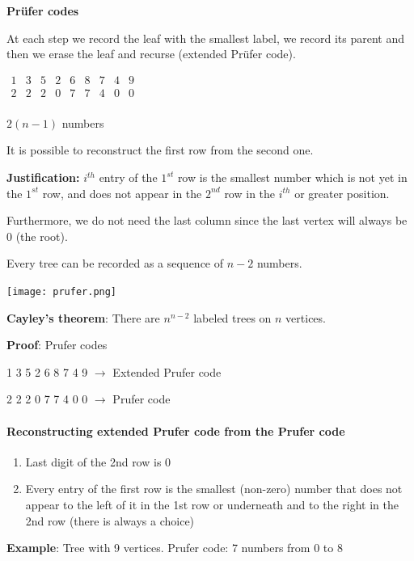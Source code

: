 \documentclass[9pt, letterpaper, oneside]{article}
\begin{document}
\textbf{Pr\"{u}fer codes}

At each step we record the leaf with the smallest label, we record its parent and then we erase the leaf and recurse (extended Pr\"{u}fer code).

$\begin{matrix}
1 & 3 & 5 & 2 & 6 & 8 & 7 & 4 & 9 \\
2 & 2 & 2 & 0 & 7 & 7 & 4 & 0 & 0 \\
\end{matrix}$

$2(n-1)$ numbers

It is possible to reconstruct the first row from the second one. 

\textbf{Justification:}
$i^{th}$ entry of the $1^{st}$ row is the smallest number which is not yet in the $1^{st}$ row, and does not appear in the $2^{nd}$ row in the $i^{th}$ or greater position.

Furthermore, we do not need the last column since the last vertex will always be 0 (the root).

Every tree can be recorded as a sequence of $n-2$ numbers.


\texttt{[image: prufer.png]}

\textbf{Cayley's theorem}: There are $n^{n-2}$ labeled trees on $n$ vertices.

\textbf{Proof}: Prufer codes

1 3 5 2 6 8 7 4 9 $\to$ Extended Prufer code

2 2 2 0 7 7 4 0 0 $\to$ Prufer code


\paragraph{Reconstructing extended Prufer code from the Prufer code}

\begin{enumerate}
\item Last digit of the 2nd row is 0
\item Every entry of the first row is the smallest (non-zero) number that does not appear to the left of it in the 1st row or underneath and to the right in the 2nd row (there is always a choice)
\end{enumerate}
\textbf{Example}: Tree with 9 vertices. Prufer code: 7 numbers from 0 to 8
\end{document}
